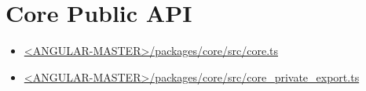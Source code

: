 \section{Core Public API}


\begin{itemize}
  \item \href{https://github.com/angular/angular/blob/master/packages/core/src/core.ts}
        {<ANGULAR-MASTER>/packages/core/src/core.ts}
\end{itemize}






\begin{itemize}
  \item \href{https://github.com/angular/angular/blob/master/packages/core/src/core_private_export.ts}
        {<ANGULAR-MASTER>/packages/core/src/core\_private\_export.ts}
\end{itemize}









